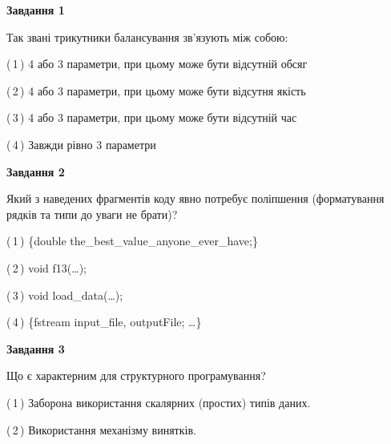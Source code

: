 \documentclass[10pt, ukrainian]{article}
\begin{document}
{
\begin {large}
{\begin {center}\textbf{Завдання 1}\end {center}}\par
Так звані трикутники балансування зв'язують між собою:\par
\vspace{2mm}



(\,1\,) 4 або 3 параметри, при цьому може бути відсутній обсяг %



(\,2\,) 4 або 3 параметри, при цьому може бути відсутня якість%



(\,3\,) 4 або 3 параметри, при цьому може бути відсутній час%



(\,4\,) Завжди рівно 3 параметри%


{\begin {center}\textbf{Завдання 2}\end {center}}\par
Який з наведених фрагментів коду явно потребує поліпшення (форматування рядків та типи до уваги не брати)?\par
\vspace{2mm}



(\,1\,) \{double the\_best\_value\_anyone\_ever\_have;\} %



(\,2\,) void f13(…);%



(\,3\,) void load\_data(…);%



(\,4\,) \{fstream input\_file, outputFile; …\}%


{\begin {center}\textbf{Завдання 3}\end {center}}\par
Що є характерним для структурного програмування?\par
\vspace{2mm}



(\,1\,) Заборона використання скалярних (простих) типів даних. %



(\,2\,) Використання механізму винятків. %




\end{large}}
\end{document}
